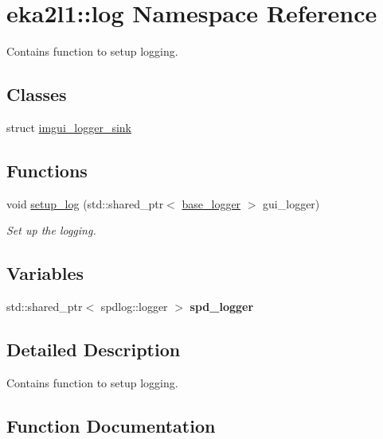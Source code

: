 \hypertarget{namespaceeka2l1_1_1log}{}\section{eka2l1\+:\+:log Namespace Reference}
\label{namespaceeka2l1_1_1log}


Contains function to setup logging.  


\subsection*{Classes}
\begin{DoxyCompactItemize}
\item 
struct \mbox{\hyperlink{structeka2l1_1_1log_1_1imgui__logger__sink}{imgui\+\_\+logger\+\_\+sink}}
\end{DoxyCompactItemize}
\subsection*{Functions}
\begin{DoxyCompactItemize}
\item 
void \mbox{\hyperlink{namespaceeka2l1_1_1log_a6a737a713dc49c7e3330a25eec090c17}{setup\+\_\+log}} (std\+::shared\+\_\+ptr$<$ \mbox{\hyperlink{classeka2l1_1_1base__logger}{base\+\_\+logger}} $>$ gui\+\_\+logger)
\begin{DoxyCompactList}\small\item\em Set up the logging. \end{DoxyCompactList}\end{DoxyCompactItemize}
\subsection*{Variables}
\begin{DoxyCompactItemize}
\item 
\mbox{\label{namespaceeka2l1_1_1log_a8ecf7c29712135c6cac290a2f6f3ebd9}} 
std\+::shared\+\_\+ptr$<$ spdlog\+::logger $>$ {\bfseries spd\+\_\+logger}
\end{DoxyCompactItemize}


\subsection{Detailed Description}
Contains function to setup logging. 

\subsection{Function Documentation}
\mbox{\label{namespaceeka2l1_1_1log_a6a737a713dc49c7e3330a25eec090c17}} 
